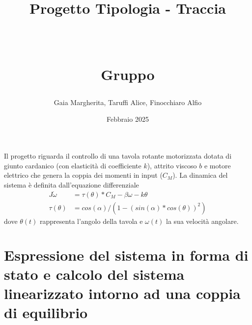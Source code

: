 \documentclass[a4paper, 11pt]{article}
\title{ \vspace{-1in}
		\huge \strut \coursename \strut 
		\\
		\Large  \strut Progetto Tipologia \tipology - Traccia \trace 
		\\
		\Large  \strut \projectname\strut
		\\
		\Large  \strut Gruppo \group\strut
		\vspace{-0.4cm}
}
\author{Gaia Margherita, Taruffi Alice, Finocchiaro Alfio}
\date{Febbraio 2025}
\begin{document}
\maketitle
\vspace{-0.5cm}

Il progetto riguarda il controllo di una tavola rotante motorizzata dotata di giunto cardanico (con elasticità di  coefficiente $k$), attrito viscoso $b$ e motore elettrico che genera la coppia dei momenti in input ($C_M$). La dinamica del sistema è definita dall'equazione differenziale
%
\begin{subequations}\label{eq:system}
\begin{align}
	J\dot \omega &= \tau(\theta) * C_M - \beta\omega - k\theta \\
	\tau(\theta) &= cos(\alpha)/ (1 - ( sin(\alpha) * cos(\theta) )^2)
\end{align}
\end{subequations}
%
dove $\theta(t)$ rappresenta l'angolo della tavola e $\omega(t)$ la sua velocità angolare.


\section{Espressione del sistema in forma di stato e calcolo del sistema linearizzato intorno ad una coppia di equilibrio}
\end{document}
